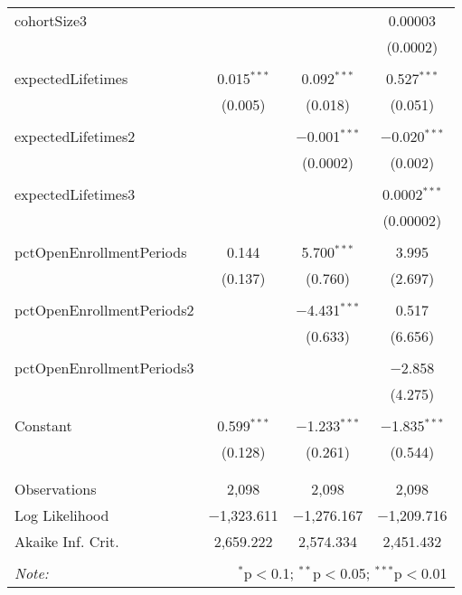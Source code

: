 \begin{table}[!htbp]
\begin{tabular}{@{\extracolsep{5pt}}lccc}
 cohortSize3 &  &  & 0.00003 \\ 
  &  &  & (0.0002) \\ 
  & & & \\ 
 expectedLifetimes & 0.015$^{***}$ & 0.092$^{***}$ & 0.527$^{***}$ \\ 
  & (0.005) & (0.018) & (0.051) \\ 
  & & & \\ 
 expectedLifetimes2 &  & $-$0.001$^{***}$ & $-$0.020$^{***}$ \\ 
  &  & (0.0002) & (0.002) \\ 
  & & & \\ 
 expectedLifetimes3 &  &  & 0.0002$^{***}$ \\ 
  &  &  & (0.00002) \\ 
  & & & \\ 
 pctOpenEnrollmentPeriods & 0.144 & 5.700$^{***}$ & 3.995 \\ 
  & (0.137) & (0.760) & (2.697) \\ 
  & & & \\ 
 pctOpenEnrollmentPeriods2 &  & $-$4.431$^{***}$ & 0.517 \\ 
  &  & (0.633) & (6.656) \\ 
  & & & \\ 
 pctOpenEnrollmentPeriods3 &  &  & $-$2.858 \\ 
  &  &  & (4.275) \\ 
  & & & \\ 
 Constant & 0.599$^{***}$ & $-$1.233$^{***}$ & $-$1.835$^{***}$ \\ 
  & (0.128) & (0.261) & (0.544) \\ 
  & & & \\ 
\hline \\[-1.8ex] 
Observations & 2,098 & 2,098 & 2,098 \\ 
Log Likelihood & $-$1,323.611 & $-$1,276.167 & $-$1,209.716 \\ 
Akaike Inf. Crit. & 2,659.222 & 2,574.334 & 2,451.432 \\ 
\hline 
\hline \\[-1.8ex] 
\textit{Note:}  & \multicolumn{3}{r}{$^{*}$p$<$0.1; $^{**}$p$<$0.05; $^{***}$p$<$0.01} \\ 
\end{tabular} 
\end{table}  
